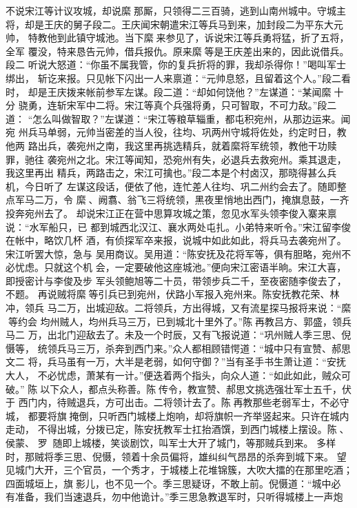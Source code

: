 不说宋江等计议攻城，却说縻那厮，只领得二三百骑，逃到山南州城中。守城主
将，却是王庆的舅子段二。王庆闻宋朝遣宋江等兵马到来，加封段二为平东大元帅，
特教他到此镇守城池。当下縻来参见了，诉说宋江等兵勇将猛，折了五将，全军
覆没，特来恳告元帅，借兵报仇。原来縻等是王庆差出来的，因此说借兵。段二
听说大怒道：“你虽不属我管，你的复兵折将的罪，我却杀得你！”喝叫军士绑出，
斩讫来报。只见帐下闪出一人来禀道：“元帅息怒，且留着这个人。”段二看时，
却是王庆拨来帐前参军左谋。段二道：“却如何饶他？”左谋道：“某闻縻十分
骁勇，连斩宋军中二将。宋江等真个兵强将勇，只可智取，不可力敌。”段二道：
“怎么叫做智取？”左谋道：“宋江等粮草辎重，都屯积宛州，从那边运来。闻宛
州兵马单弱，元帅当密差的当人役，往均、巩两州守城将佐处，约定时日，教他两
路出兵，袭宛州之南，我这里再挑选精兵，就着縻将军统领，教他干功赎罪，驰往
袭宛州之北。宋江等闻知，恐宛州有失，必退兵去救宛州。乘其退走，我这里再出
精兵，两路击之，宋江可擒也。”段二本是个村卤汉，那晓得甚么兵机，今日听了
左谋这段话，便依了他，连忙差人往均、巩二州约会去了。随即整点军马二万，令
縻、阙翥、翁飞三将统领，黑夜里悄地出西门，掩旗息鼓，一齐投奔宛州去了。
却说宋江正在营中思算攻城之策，忽见水军头领李俊入寨来禀说：“水军船只，已
都到城西北汉江、襄水两处屯扎。小弟特来听令。”宋江留李俊在帐中，略饮几杯
酒，有侦探军卒来报，说城中如此如此，将兵马去袭宛州了。宋江听罢大惊，急与
吴用商议。吴用道：“陈安抚及花将军等，俱有胆略，宛州不必忧虑。只就这个机
会，一定要破他这座城池。”便向宋江密语半晌。宋江大喜，即授密计与李俊及步
军头领鲍旭等二十员，带领步兵二千，至夜密随李俊去了，不题。
再说贼将縻等引兵已到宛州，伏路小军报入宛州来。陈安抚教花荣、林冲，领兵
马二万，出城迎敌。二将领兵，方出得城，又有流星探马报将来说：“縻等约会
均州贼人，均州兵马三万，已到城北十里外了。”陈再教吕方、郭盛，领兵马二
万，出北门迎敌去了。未及一个时辰，又有飞报说道：“巩州贼人季三思、倪慑等，
统领兵马三万，杀奔到西门来。”众人都相顾错愕道：“城中只有宣赞、郝思文二
将，兵马虽有一万，大半是老弱，如何守御？”当有圣手书生萧让道：“安抚大人，
不必忧虑，萧某有一计。”便迭着两个指头，向众人道：“如此如此，贼众可破。”
陈以下众人，都点头称善。陈传令，教宣赞、郝思文挑选强壮军士五千，伏于
西门内，待贼退兵，方可出击。二将领计去了。陈再教那些老弱军士，不必守城，
都要将旗掩倒，只听西门城楼上炮响，却将旗帜一齐举竖起来。只许在城内走动，
不得出城，分拨已定，陈安抚教军士扛抬酒馔，到西门城楼上摆设。陈、侯蒙、
罗，随即上城楼，笑谈剧饮，叫军士大开了城门，等那贼兵到来。
多样时，那贼将季三思、倪慑，领着十余员偏将，雄纠纠气昂昂的杀奔到城下来。
望见城门大开，三个官员，一个秀才，于城楼上花堆锦簇，大吹大擂的在那里吃酒；
四面城垣上，旗影儿，也不见一个。季三思疑讶，不敢上前。倪慑道：“城中必
有准备，我们当速退兵，勿中他诡计。”季三思急教退军时，只听得城楼上一声炮
